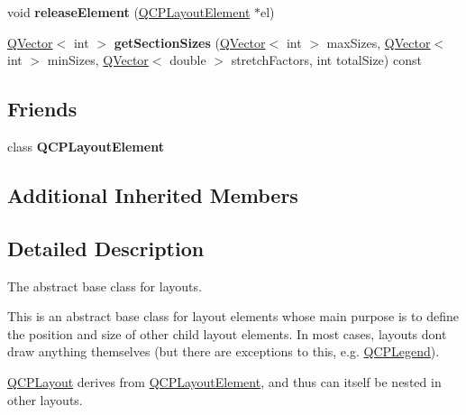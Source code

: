 \begin{DoxyCompactItemize}
\item 
void {\bfseries release\+Element} (\hyperlink{class_q_c_p_layout_element}{Q\+C\+P\+Layout\+Element} $\ast$el)\hypertarget{class_q_c_p_layout_a4afbb4bef0071f72f91afdac4433a18e}{}\label{class_q_c_p_layout_a4afbb4bef0071f72f91afdac4433a18e}

\item 
\hyperlink{class_q_vector}{Q\+Vector}$<$ int $>$ {\bfseries get\+Section\+Sizes} (\hyperlink{class_q_vector}{Q\+Vector}$<$ int $>$ max\+Sizes, \hyperlink{class_q_vector}{Q\+Vector}$<$ int $>$ min\+Sizes, \hyperlink{class_q_vector}{Q\+Vector}$<$ double $>$ stretch\+Factors, int total\+Size) const \hypertarget{class_q_c_p_layout_a4bce5e68193f082c4514fbf3eb553086}{}\label{class_q_c_p_layout_a4bce5e68193f082c4514fbf3eb553086}

\end{DoxyCompactItemize}
\subsection*{Friends}
\begin{DoxyCompactItemize}
\item 
class {\bfseries Q\+C\+P\+Layout\+Element}\hypertarget{class_q_c_p_layout_a9617e8ee457014d1c3a9f8379d3c667d}{}\label{class_q_c_p_layout_a9617e8ee457014d1c3a9f8379d3c667d}

\end{DoxyCompactItemize}
\subsection*{Additional Inherited Members}


\subsection{Detailed Description}
The abstract base class for layouts. 

This is an abstract base class for layout elements whose main purpose is to define the position and size of other child layout elements. In most cases, layouts don\textquotesingle{}t draw anything themselves (but there are exceptions to this, e.\+g. \hyperlink{class_q_c_p_legend}{Q\+C\+P\+Legend}).

\hyperlink{class_q_c_p_layout}{Q\+C\+P\+Layout} derives from \hyperlink{class_q_c_p_layout_element}{Q\+C\+P\+Layout\+Element}, and thus can itself be nested in other layouts.

